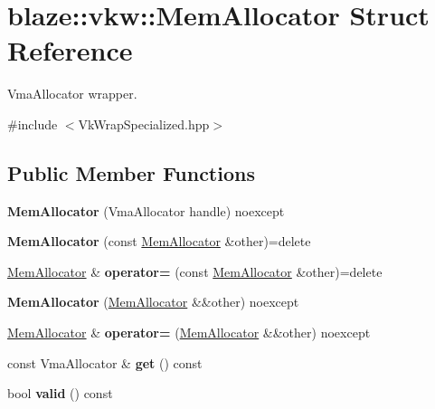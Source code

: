 \hypertarget{structblaze_1_1vkw_1_1MemAllocator}{}\section{blaze\+:\+:vkw\+:\+:Mem\+Allocator Struct Reference}
\label{structblaze_1_1vkw_1_1MemAllocator}


Vma\+Allocator wrapper.  




{\ttfamily \#include $<$Vk\+Wrap\+Specialized.\+hpp$>$}

\subsection*{Public Member Functions}
\begin{DoxyCompactItemize}
\item 
\mbox{\label{structblaze_1_1vkw_1_1MemAllocator_af305ba8c4e3ecf6caeac99d34b65e3dc}} 
{\bfseries Mem\+Allocator} (Vma\+Allocator handle) noexcept
\item 
\mbox{\label{structblaze_1_1vkw_1_1MemAllocator_a90cc2ff38c73fa3473a6c4bfd2b56e75}} 
{\bfseries Mem\+Allocator} (const \hyperlink{structblaze_1_1vkw_1_1MemAllocator}{Mem\+Allocator} \&other)=delete
\item 
\mbox{\label{structblaze_1_1vkw_1_1MemAllocator_abaa8a28ea2fcf3fd53507bcba258d83a}} 
\hyperlink{structblaze_1_1vkw_1_1MemAllocator}{Mem\+Allocator} \& {\bfseries operator=} (const \hyperlink{structblaze_1_1vkw_1_1MemAllocator}{Mem\+Allocator} \&other)=delete
\item 
\mbox{\label{structblaze_1_1vkw_1_1MemAllocator_a3485d1f73c84d6b23ef1083ac5f49204}} 
{\bfseries Mem\+Allocator} (\hyperlink{structblaze_1_1vkw_1_1MemAllocator}{Mem\+Allocator} \&\&other) noexcept
\item 
\mbox{\label{structblaze_1_1vkw_1_1MemAllocator_a4afa989949e751660e4c2e61184df441}} 
\hyperlink{structblaze_1_1vkw_1_1MemAllocator}{Mem\+Allocator} \& {\bfseries operator=} (\hyperlink{structblaze_1_1vkw_1_1MemAllocator}{Mem\+Allocator} \&\&other) noexcept
\item 
\mbox{\label{structblaze_1_1vkw_1_1MemAllocator_a92edd6e6ac547f5b4048c8b32addde83}} 
const Vma\+Allocator \& {\bfseries get} () const
\item 
\mbox{\label{structblaze_1_1vkw_1_1MemAllocator_a4a64905f0886100edd8c3a41489b5078}} 
bool {\bfseries valid} () const
\end{DoxyCompactItemize}

